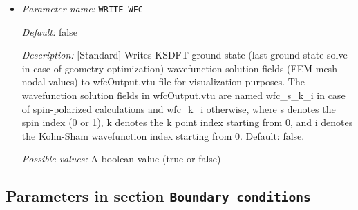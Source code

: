 \begin{itemize}
{\it Possible values:} A boolean value (true or false)
\item {\it Parameter name:} {\tt WRITE WFC}
\label{parameters:WRITE WFC}
\label{parameters:WRITE_20WFC}




{\it Default:} false


{\it Description:} [Standard] Writes KSDFT ground state (last ground state solve in case of geometry optimization) wavefunction solution fields (FEM mesh nodal values) to wfcOutput.vtu file for visualization purposes. The wavefunction solution fields in wfcOutput.vtu are named wfc\_s\_k\_i in case of spin-polarized calculations and wfc\_k\_i otherwise, where s denotes the spin index (0 or 1), k denotes the k point index starting from 0, and i denotes the Kohn-Sham wavefunction index starting from 0. Default: false.


{\it Possible values:} A boolean value (true or false)
\end{itemize}



\subsection{Parameters in section \tt Boundary conditions}
\label{parameters:Boundary_20conditions}

